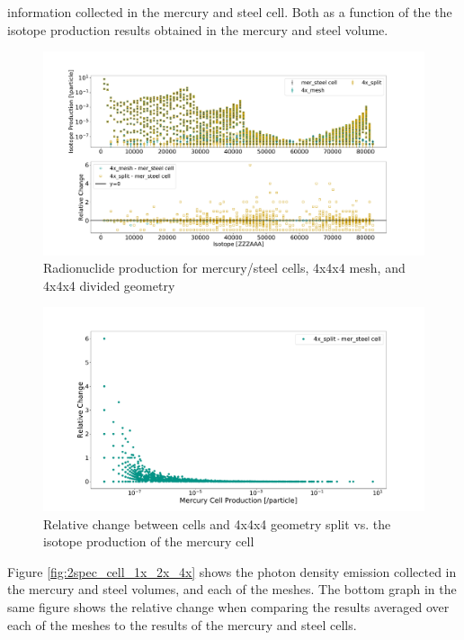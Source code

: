 information collected in the mercury and steel cell. Both as a function of the
the isotope production results obtained in the mercury and steel volume.
%
\begin{figure}[H]
 \centering
 \includegraphics[scale=0.4,trim={2cm 1cm 3cm 2cm},clip]{../figs/toy_p2/prod_VPII_4x.pdf}
 \caption{Radionuclide production for mercury/steel cells, 4x4x4 mesh, and 4x4x4 divided geometry}
 \label{fig:2prod_cell_4x}
\end{figure}
%
\begin{figure}[H]
 \centering
 \includegraphics[scale=0.35,trim={3cm 0.5cm 4.5cm 3cm},clip]{../figs/toy_p2/prod_VPII_rc_4x_split.pdf}
 \caption{Relative change between cells and 4x4x4 geometry split vs. the isotope production of the mercury cell}
 \label{fig:2prod_cell_4x_rc}
\end{figure}
%
Figure \ref{fig:2spec_cell_1x_2x_4x} shows the photon density emission
collected in the mercury and steel volumes, and each of the meshes. The bottom
graph in the same figure shows the relative change when comparing the results
averaged over each of the meshes to the results of the mercury and steel cells.
